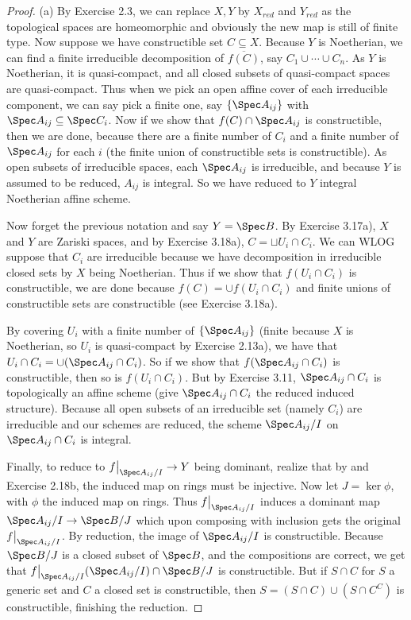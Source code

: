 \begin{proof}
	(a) By Exercise 2.3, we can replace $X,Y $ by $X_{red} $ and $Y_{red} $ as the topological spaces are homeomorphic and obviously the new map is still of finite type.
	Now suppose we have constructible set $C \subseteq X $.
	Because $Y $ is Noetherian, we can find a finite irreducible decomposition of $\overline{f(C)}  $, say $C_{1}\cup \cdots \cup C_n $.
	As $Y $ is Noetherian, it is quasi-compact, and all closed subsets of quasi-compact spaces are quasi-compact.
	Thus when we pick an open affine cover of each irreducible component, we can say pick a finite one, say $\{\Spec A_{ij}\}  $ with $\Spec A_{ij} \subseteq \Spec C_i $.
	Now if we show that $f(C) \cap \Spec A_{ij} $ is constructible, then we are done, because there are a finite number of $C_i $ and a finite number of $\Spec A_{ij} $ for each $i $ (the finite union of constructible sets is constructible).
	As open subsets of irreducible spaces, each $\Spec A_{ij} $ is irreducible, and because $Y $ is assumed to be reduced, $A_{ij} $ is integral.
	So we have reduced to $Y $ integral Noetherian affine scheme.

	Now forget the previous notation and say $Y = \Spec B $.
	By Exercise 3.17a), $X $ and $Y $ are Zariski spaces, and by Exercise 3.18a), $C =\sqcup U_i\cap C_i $.
	We can WLOG suppose that $C_i $ are irreducible because we have decomposition in irreducible closed sets by $X $ being Noetherian.
	Thus if we show that $f(U_i\cap C_i) $ is constructible, we are done because $f(C) = \cup f(U_i\cap C_i) $ and finite unions of constructible sets are constructible (see Exercise 3.18a).

	By covering $U_i $ with a finite number of $\{\Spec A_{ij}\}$ (finite because $X $ is Noetherian, so $U_i $ is quasi-compact by Exercise 2.13a), we have that $U_i\cap C_i = \cup (\Spec A_{ij}\cap C_i)$.
	So if we show that $f(\Spec A_{ij} \cap C_i )$ is constructible, then so is $f(U_i\cap C_i) $.
	But by Exercise 3.11, $\Spec A_{ij}\cap C_i $ is topologically an affine scheme (give $\Spec A_{ij}\cap C_i $ the reduced induced structure).
	Because all open subsets of an irreducible set (namely $C_i $) are irreducible and our schemes are reduced, the scheme $\Spec A_{ij} / I $ on $\Spec A_{ij} \cap C_i $ is integral.

	Finally, to reduce to $f\big|_{\Spec A_{ij} / I} \to Y$ being dominant, realize that by  and Exercise 2.18b, the induced map on rings must be injective.
	Now let $J = \ker \phi  $, with $\phi  $ the induced map on rings.
	Thus $f\big|_{\Spec A_{ij} / I} $ induces a dominant map $\Spec A_{ij} / I \to \Spec B / J$ which upon composing with inclusion gets the original $f\big|_{\Spec A_{ij} / I} $.
	By reduction, the image of $\Spec A_{ij} / I $ is constructible.
	Because $\Spec B / J $ is a closed subset of $\Spec B $, and the compositions are correct, we get that $f\big|_{\Spec A_{ij} / I}(\Spec A_{ij} / I) \cap \Spec B / J $ is constructible.
	But if $S \cap C $ for $S $ a generic set and $C $ a closed set is constructible, then $S = (S\cap C) \cup (S \cap C^C) $ is constructible, finishing the reduction.


\end{proof}

